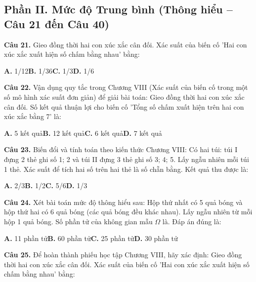 \documentclass[11pt,a4paper]{article}
\begin{document}
\subsection*{\color{accent} Phần II. Mức độ Trung bình (Thông hiểu -- Câu 21 đến Câu 40)}
\textbf{\color{primary} Câu 21.} Gieo đồng thời hai con xúc xắc cân đối. Xác suất của biến cố 'Hai con xúc xắc xuất hiện số chấm bằng nhau' bằng:\par
\hspace*{1.5em}\textbf{A.} 1/12\quad\quad \textbf{B.} 1/36\quad\quad \textbf{C.} 1/3\quad\quad \textbf{D.} 1/6\par\vspace{2pt}
\textbf{\color{primary} Câu 22.} Vận dụng quy tắc trong Chương VIII (Xác suất của biến cố trong một số mô hình xác suất đơn giản) để giải bài toán: Gieo đồng thời hai con xúc xắc cân đối. Số kết quả thuận lợi cho biến cố 'Tổng số chấm xuất hiện trên hai con xúc xắc bằng 7' là:\par
\hspace*{1.5em}\textbf{A.} 5 kết quả\quad\quad \textbf{B.} 12 kết quả\quad\quad \textbf{C.} 6 kết quả\quad\quad \textbf{D.} 7 kết quả\par\vspace{2pt}
\textbf{\color{primary} Câu 23.} Biến đổi và tính toán theo kiến thức Chương VIII: Có hai túi: túi I đựng 2 thẻ ghi số 1; 2 và túi II đựng 3 thẻ ghi số 3; 4; 5. Lấy ngẫu nhiên mỗi túi 1 thẻ. Xác suất để tích hai số trên hai thẻ là số chẵn bằng. Kết quả thu được là:\par
\hspace*{1.5em}\textbf{A.} 2/3\quad\quad \textbf{B.} 1/2\quad\quad \textbf{C.} 5/6\quad\quad \textbf{D.} 1/3\par\vspace{2pt}
\textbf{\color{primary} Câu 24.} Xét bài toán mức độ thông hiểu sau: Hộp thứ nhất có 5 quả bóng và hộp thứ hai có 6 quả bóng (các quả bóng đều khác nhau). Lấy ngẫu nhiên từ mỗi hộp 1 quả bóng. Số phần tử của không gian mẫu $\Omega$ là. Đáp án đúng là:\par
\hspace*{1.5em}\textbf{A.} 11 phần tử\quad\quad \textbf{B.} 60 phần tử\quad\quad \textbf{C.} 25 phần tử\quad\quad \textbf{D.} 30 phần tử\par\vspace{2pt}
\textbf{\color{primary} Câu 25.} Để hoàn thành phiếu học tập Chương VIII, hãy xác định: Gieo đồng thời hai con xúc xắc cân đối. Xác suất của biến cố 'Hai con xúc xắc xuất hiện số chấm bằng nhau' bằng:\par
\end{document}
